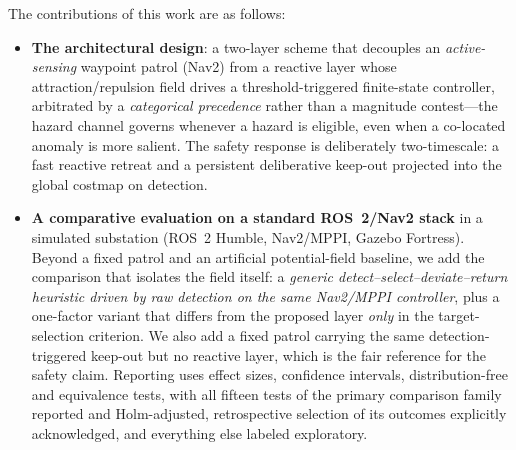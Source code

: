 The contributions of this work are as follows:
\begin{itemize}
\item \textbf{The architectural design}: a two-layer scheme that decouples an
\emph{active-sensing} waypoint patrol (Nav2) from a reactive layer whose
attraction/repulsion field drives a threshold-triggered finite-state controller,
arbitrated by a \emph{categorical precedence} rather than a magnitude contest---the
hazard channel governs whenever a hazard is eligible, even when a co-located anomaly
is more salient. The safety response is deliberately two-timescale: a fast reactive
retreat and a persistent deliberative keep-out projected into the global costmap on
detection.

\item \textbf{A comparative evaluation on a standard ROS~2/Nav2 stack} in a simulated
substation (ROS~2 Humble, Nav2/MPPI, Gazebo Fortress). Beyond a fixed patrol and an
artificial potential-field baseline, we add the comparison that isolates the field
itself: a \emph{generic detect--select--deviate--return heuristic driven by raw
detection on the same Nav2/MPPI controller}, plus a one-factor variant that differs
from the proposed layer \emph{only} in the target-selection criterion. We also add a
fixed patrol carrying the same detection-triggered keep-out but no reactive layer,
which is the fair reference for the safety claim. Reporting uses effect sizes,
confidence intervals, distribution-free and equivalence tests, with all fifteen tests
of the primary comparison family reported and Holm-adjusted, retrospective selection
of its outcomes explicitly acknowledged, and everything else labeled exploratory.


\end{itemize}
